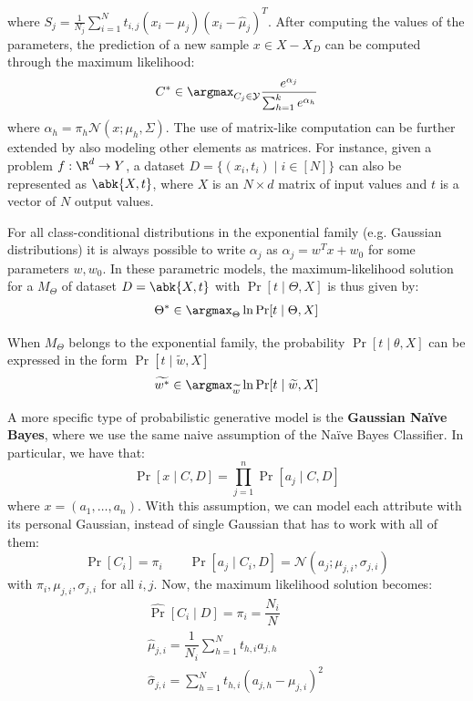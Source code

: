\documentclass[a4paper, 12pt]{report}
\begin{document}
    where $S_j = \frac{1}{N_j} \sum_{i = 1}^N t_{i,j}(x_i - \widehat \mu_j)(x_i - \widehat \mu_j)^T$. After computing the values of the parameters, the prediction of a new sample $x \in X-X_D$ can be computed through the maximum likelihood:
    \[C^* \in \argmax_{C_j \in \mathcal{Y}} \frac{e^{\alpha_j}}{\sum_{h = 1}^k e^{\alpha_h}}\]
    where $\alpha_h = \pi_h \mathcal{N}(x; \mu_h, \Sigma)$. The use of matrix-like computation can be further extended by also modeling other elements as matrices. For instance, given a problem $f : \R^d \to Y$, a dataset $D = \{(x_i, t_i) \mid i \in [N]\}$ can also be represented as $\abk{X,t}$, where $X$ is an $N \times d$ matrix of input values and $t$ is a vector of $N$ output values.

    For all class-conditional distributions in the exponential family (e.g. Gaussian distributions) it is always possible to write $\alpha_j$ as $\alpha_j = w^Tx + w_0$ for some parameters $w, w_0$. In these parametric models, the maximum-likelihood solution for a $M_\Theta$ of dataset $D = \abk{X, t}$ with $\Pr[t \mid \Theta, X]$ is thus given by:
    \[\Theta^* \in \argmax_{\Theta} \ln \Pr[t \mid \Theta, X]\]
    
    When $M_\Theta$ belongs to the exponential family, the probability $\Pr[t \mid \theta, X]$ can be expressed in the form $\Pr[t \mid \widetilde{w}, X]$
    \[\widetilde{w^*} \in \argmax_{\widetilde{w}} \ln \Pr[t \mid \widetilde{w}, X]\]

    A more specific type of probabilistic generative model is the \textbf{Gaussian Naïve Bayes}, where we use the same naive assumption of the Naïve Bayes Classifier. In particular, we have that:
    \[\Pr[x \mid C, D] = \prod_{j = 1}^n \Pr[a_j \mid C,D]\]
    where $x = (a_1, \ldots, a_n)$. With this assumption, we can model each attribute with its personal Gaussian, instead of single Gaussian that has to work with all of them:
    \[\Pr[C_i] = \pi_i \qquad \Pr[a_j \mid C_i, D] = \mathcal{N}(a_j; \mu_{j,i}, \sigma_{j,i})\]
    with $\pi_i, \mu_{j,i}, \sigma_{j,i}$ for all $i, j$. Now, the maximum likelihood solution becomes:
    \[\begin{array}{ccc}
        \widehat \Pr[C_i \mid D] = \pi_i = \dfrac{N_i}{N} \\
        \widehat \mu_{j,i} = \dfrac{1}{N_i} \sum\limits_{h = 1}^N t_{h,i} a_{j,h} \\ \widehat \sigma_{j,i} = \sum\limits_{h = 1}^N t_{h,i} (a_{j,h} - \mu_{j,i})^2 \
    \end{array}\]
\end{document}
